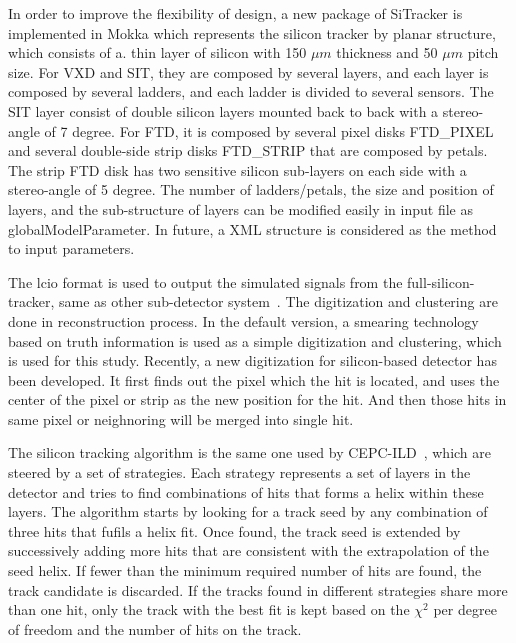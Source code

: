 In order to improve the flexibility of design, a new package of SiTracker is implemented in Mokka which represents the silicon
tracker by planar structure, which consists of a. thin layer of silicon with 150 $\mu m$ thickness and 50 $\mu m$ pitch size. 
For VXD and SIT, they are composed by several layers, and each layer is composed by several ladders, and 
each ladder is divided to several sensors. The SIT layer consist of double silicon layers mounted back to back with a stereo-angle of 7 degree.
For FTD, it is composed by several pixel disks FTD\_PIXEL and several double-side strip 
disks FTD\_STRIP that are composed by petals. The strip FTD disk has two sensitive silicon sub-layers on each side with a stereo-angle of 5 degree.
The number of ladders/petals, the size and position of layers, and the sub-structure of layers can be modified easily in input file as 
globalModelParameter. In future, a XML structure is considered as the method to input parameters.

The lcio format is used to output the simulated signals from the full-silicon-tracker, same as other 
sub-detector system~\cite{lcsim}. The digitization and clustering are done 
in reconstruction process. In the default version, a smearing technology based on truth information 
is used as a simple digitization and clustering, which is used for this study. 
Recently, a new digitization for silicon-based detector has been developed. It first finds out the pixel which the hit is located, and uses the 
center of the pixel or strip as the new position for the hit. And then those hits in same pixel or neighnoring will be merged into single hit.

The silicon tracking algorithm is the same one used by CEPC-ILD~\cite{cepcILD}, which are steered by a set of strategies.
Each strategy represents a set of layers in the detector and tries to find combinations of hits that forms a helix within these layers.
The algorithm starts by looking for a track seed by any combination of three hits that fufils a helix fit. Once found, the track seed is extended
by successively adding more hits that are consistent with the extrapolation of the seed helix.
If fewer than the minimum required number of hits are found, the track candidate is discarded. If the tracks found in different strategies share
more than one hit, only the track with the best fit is kept based on the $\chi^2$ per degree of freedom and the number of hits on the track.
  
